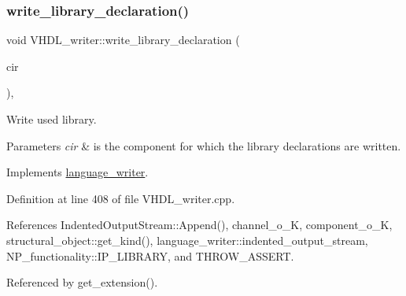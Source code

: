 \subsubsection{\texorpdfstring{write\+\_\+library\+\_\+declaration()}{write\_library\_declaration()}}
{\footnotesize\ttfamily void V\+H\+D\+L\+\_\+writer\+::write\+\_\+library\+\_\+declaration (\begin{DoxyParamCaption}\item[{const \hyperlink{structural__objects_8hpp_a8ea5f8cc50ab8f4c31e2751074ff60b2}{structural\+\_\+object\+Ref} \&}]{cir }\end{DoxyParamCaption})\hspace{0.3cm}{\ttfamily [override]}, {\ttfamily [virtual]}}



Write used library. 


\begin{DoxyParams}{Parameters}
{\em cir} & is the component for which the library declarations are written. \\
\hline
\end{DoxyParams}


Implements \hyperlink{classlanguage__writer_ab43debc2245af8078bb36b157d780aca}{language\+\_\+writer}.



Definition at line 408 of file V\+H\+D\+L\+\_\+writer.\+cpp.



References Indented\+Output\+Stream\+::\+Append(), channel\+\_\+o\+\_\+K, component\+\_\+o\+\_\+K, structural\+\_\+object\+::get\+\_\+kind(), language\+\_\+writer\+::indented\+\_\+output\+\_\+stream, N\+P\+\_\+functionality\+::\+I\+P\+\_\+\+L\+I\+B\+R\+A\+RY, and T\+H\+R\+O\+W\+\_\+\+A\+S\+S\+E\+RT.



Referenced by get\+\_\+extension().

